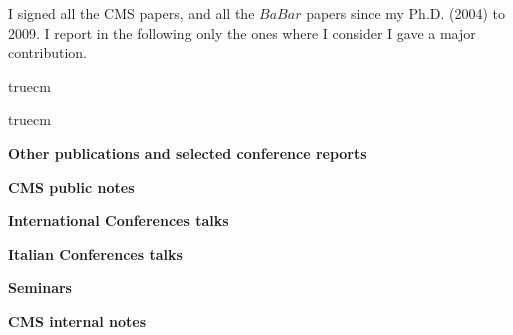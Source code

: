 \documentclass[11pt,twoside,a4paper]{article}
\begin{document}
I signed all the CMS papers, and all the $BaBar$ papers since my
Ph.D. (2004) to 2009. I report in the following only the ones where 
I consider I gave a major contribution. 

 truecm

\begin{thebibliography}{99999}
  

 truecm

  
  \begin{center}
    {\bf Other publications and selected conference reports }
    \\
  \end{center}
  

  \newpage

  \begin{center}
    {\bf CMS public notes }
    \\
  \end{center}
  

  \begin{center}
    {\bf International Conferences talks}
    \\
  \end{center}
  

  \begin{center}
    {\bf Italian Conferences talks}
    \\
  \end{center}
  
  
  \begin{center}
    {\bf Seminars}
    \\
  \end{center}
  

  \newpage

  \begin{center}
    {\bf CMS internal notes }
    \\
  \end{center}
  
  


%  

\end{thebibliography}
\end{document}
